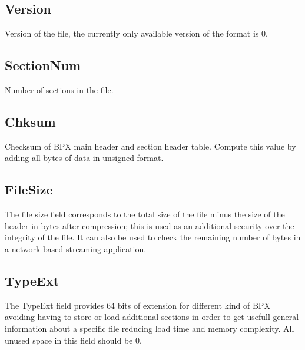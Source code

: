 \subsection{Version}
Version of the file, the currently only available version of the format is 0.

\subsection{SectionNum}
Number of sections in the file.

\subsection{Chksum}
Checksum of BPX main header and section header table. Compute this value by adding all bytes of data in unsigned format.

\subsection{FileSize}
The file size field corresponds to the total size of the file minus the size of the header in bytes after compression; this is used as an additional security over the integrity of the file. It can also be used to check the remaining number of bytes in a network based streaming application.

\subsection{TypeExt}
The TypeExt field provides 64 bits of extension for different kind of BPX avoiding having to store or load additional sections in order to get usefull general information about a specific file reducing load time and memory complexity.\newline
All unused space in this field should be 0.
